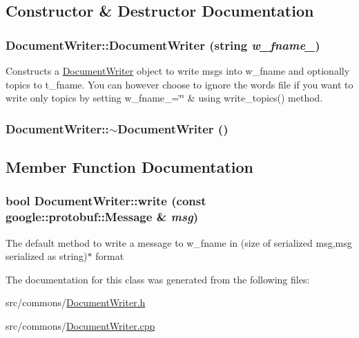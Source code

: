 \subsection{Constructor \& Destructor Documentation}
\hypertarget{class_document_writer_ab13000f42effbe825b5d3cdc7ed9615d}{
\subsubsection[{DocumentWriter}]{\setlength{\rightskip}{0pt plus 5cm}DocumentWriter::DocumentWriter (string {\em w\_\-fname\_\-})}}
\label{class_document_writer_ab13000f42effbe825b5d3cdc7ed9615d}
Constructs a \hyperlink{class_document_writer}{DocumentWriter} object to write msgs into w\_\-fname and optionally topics to t\_\-fname. You can however choose to ignore the words file if you want to write only topics by setting w\_\-fname\_\-=\char`\"{}\char`\"{} \& using write\_\-topics() method. \hypertarget{class_document_writer_a71da55790068366b80289c6da2f936fe}{
\subsubsection[{$\sim$DocumentWriter}]{\setlength{\rightskip}{0pt plus 5cm}DocumentWriter::$\sim$DocumentWriter ()}}
\label{class_document_writer_a71da55790068366b80289c6da2f936fe}


\subsection{Member Function Documentation}
\hypertarget{class_document_writer_a5d532963d09bdd313cd3c094e8bbff16}{
\subsubsection[{write}]{\setlength{\rightskip}{0pt plus 5cm}bool DocumentWriter::write (const google::protobuf::Message \& {\em msg})}}
\label{class_document_writer_a5d532963d09bdd313cd3c094e8bbff16}
The default method to write a message to w\_\-fname in (size of serialized msg,msg serialized as string)$\ast$ format 

The documentation for this class was generated from the following files:\begin{DoxyCompactItemize}
\item 
src/commons/\hyperlink{_document_writer_8h}{DocumentWriter.h}\item 
src/commons/\hyperlink{_document_writer_8cpp}{DocumentWriter.cpp}\end{DoxyCompactItemize}
